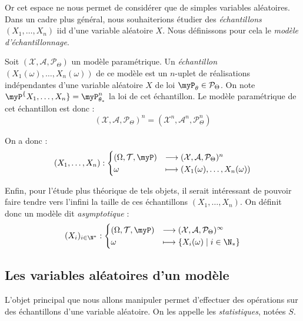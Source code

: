Or cet espace ne nous permet de considérer que de simples variables aléatoires. Dans un cadre plus général, 
nous souhaiterions étudier des \emph{échantillons} $(X_1, \dots, X_n)$ iid d'une variable aléatoire 
$X$. Nous définissons pour cela le \emph{modèle d'échantillonnage}. 

\begin{definition}
    Soit $( \mathcal{X}, \mathcal{A}, \mathcal{P}_{\Theta})$ un modèle paramétrique. 
    Un \emph{échantillon} $(X_1( \omega), \dots, X_n( \omega))$ de ce modèle est un $n$-uplet de réalisations 
    indépendantes d'une variable aléatoire $X$ de loi $ \myP_\theta \in \mathcal{P}_\Theta$. 
    On note $ \myP^\{X_1, \dots, X_n\} = \myP_{\theta_*}^{n}$ la loi de cet échantillon. Le modèle 
    paramétrique de cet échantillon est donc : 
        $$ ( \mathcal{X}, \mathcal{A}, \mathcal{P}_\Theta)^n = ( \mathcal{X}^n, \mathcal{A}^n, \mathcal{P}_{\Theta}^{n}) $$
\end{definition}

On a donc : 
    $$ 
        (X_1, \dots, X_n) : 
            \begin{cases}
                ( \Omega, \mathcal{T}, \myP) &\longrightarrow ( \mathcal{X}, \mathcal{A}, \mathcal{P}_\Theta)^n \\ 
                \omega &\longmapsto (X_1( \omega), \dots, X_n( \omega))
            \end{cases}
    $$

Enfin, pour l'étude plus théorique de tels objets, il serait intéressant de pouvoir faire 
tendre vers l'infini la taille de ces échantillons $(X_1, \dots, X_n)$. On définit donc un 
modèle dit \emph{asymptotique} : 
    $$ 
        (X_i)_{i \in \N^*} : 
        \begin{cases}
            ( \Omega, \mathcal{T}, \myP) & \longrightarrow ( \mathcal{X}, \mathcal{A}, \mathcal{P}_\Theta)^\infty \\ 
            \omega & \longmapsto \{X_i( \omega) \mid i \in \N_*\}
        \end{cases}
    $$

\subsection{Les variables aléatoires d'un modèle}

L'objet principal que nous allons manipuler permet d'effectuer des opérations sur des échantillons 
d'une variable aléatoire. On les appelle les \emph{statistiques}, notées $S$. 

